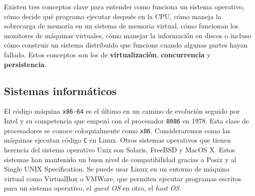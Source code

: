 
Existen tres conceptos clave para entender como funciona un sistema operativo, cómo decide qué programa ejecutar después en la CPU, cómo maneja la sobrecarga de memoria en un sistema de memoria virtual, cómo funcionan los monitores de máquinas virtuales, cómo manejar la información en discos o incluso cómo construir un sistema distribuido que funcione cuando algunas partes hayan fallado. Estos conceptos son los de \textbf{virtualización}, \textbf{concurrencia} y \textbf{persistencia}.

\subsection{Sistemas informáticos}

El código máquina \texttt{x86-64} es el último en un camino de evolución seguido por Intel y su competencia que empezó con el procesador \texttt{8086} en 1978. Esta clase de procesadores se conoce coloquialmente como \texttt{x86}. Consideraremos como las máquinas ejecutan código \texttt{C} en Linux. Otros sistemas operativos que tienen herencia del sistema operativo Unix son Solaris, FreeBSD y MacOS X. Estos sistemas han mantenido un buen nivel de compatibilidad gracias a Posix y al Single UNIX Specification. Se puede usar Linux en un entorno de máquina virtual como VirtualBox o VMWare, que permiten ejecutar programas escritos para un sistema operativo, el \textit{guest OS} en otro, el \textit{host OS}.

